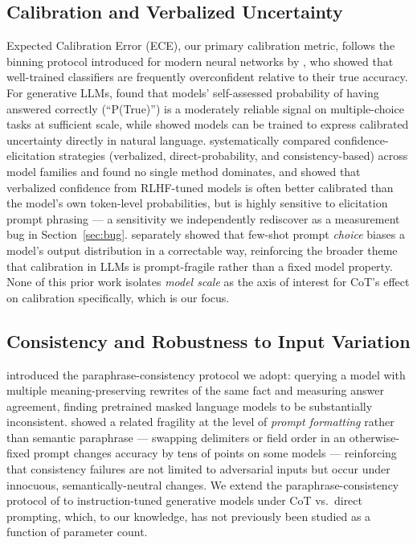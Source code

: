 \documentclass{article}
\begin{document}
\subsection{Calibration and Verbalized Uncertainty}

Expected Calibration Error (ECE), our primary calibration metric, follows the binning protocol introduced for modern neural networks by \citet{guo2017calibration}, who showed that well-trained classifiers are frequently overconfident relative to their true accuracy. For generative LLMs, \citet{kadavath2022know} found that models' self-assessed probability of having answered correctly (``P(True)'') is a moderately reliable signal on multiple-choice tasks at sufficient scale, while \citet{lin2022teaching} showed models can be trained to express calibrated uncertainty directly in natural language. \citet{xiong2024uncertainty} systematically compared confidence-elicitation strategies (verbalized, direct-probability, and consistency-based) across model families and found no single method dominates, and \citet{tian2023justask} showed that verbalized confidence from RLHF-tuned models is often better calibrated than the model's own token-level probabilities, but is highly sensitive to elicitation prompt phrasing --- a sensitivity we independently rediscover as a measurement bug in Section~\ref{sec:bug}. \citet{zhao2021calibrate} separately showed that few-shot prompt \emph{choice} biases a model's output distribution in a correctable way, reinforcing the broader theme that calibration in LLMs is prompt-fragile rather than a fixed model property. None of this prior work isolates \emph{model scale} as the axis of interest for CoT's effect on calibration specifically, which is our focus.

\subsection{Consistency and Robustness to Input Variation}

\citet{elazar2021consistency} introduced the paraphrase-consistency protocol we adopt: querying a model with multiple meaning-preserving rewrites of the same fact and measuring answer agreement, finding pretrained masked language models to be substantially inconsistent. \citet{sclar2024quantifying} showed a related fragility at the level of \emph{prompt formatting} rather than semantic paraphrase --- swapping delimiters or field order in an otherwise-fixed prompt changes accuracy by tens of points on some models --- reinforcing that consistency failures are not limited to adversarial inputs but occur under innocuous, semantically-neutral changes. We extend the paraphrase-consistency protocol of \citet{elazar2021consistency} to instruction-tuned generative models under CoT vs.\ direct prompting, which, to our knowledge, has not previously been studied as a function of parameter count.
\end{document}
